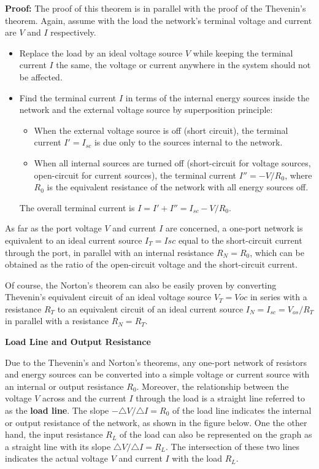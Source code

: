 \begin{itemize}
{\bf Proof:} The proof of this theorem is in parallel with the proof of the 
Thevenin's theorem. Again, assume with the load the network's terminal voltage 
and current are $V$ and $I$ respectively. 


\begin{itemize}
\item Replace the load by an ideal voltage source $V$ while keeping
  the terminal current $I$ the same, the voltage or current anywhere
  in the system should not be affected. 
	
\item Find the terminal current $I$ in terms of the internal energy sources 
  inside the network and the external voltage source by superposition principle:
  \begin{itemize}
  \item When the external voltage source is off (short circuit), the 
    terminal current $I'=I_{sc}$ is due only to the sources internal 
    to the network.
  \item When all internal sources are turned off (short-circuit for
    voltage sources, open-circuit for current sources), the terminal 
    current $I''=-V/R_0$, where $R_0$ is the equivalent resistance of 
    the network with all energy sources off.
  \end{itemize}
  The overall terminal current is $I=I'+I''=I_{sc}-V/R_0$. 
\end{itemize}
As far as the port voltage $V$ and current $I$ are concerned, a one-port
network is equivalent to an ideal current source $I_T=I{sc}$ equal to the
short-circuit current through the port, in parallel with an internal resistance
$R_N=R_0$, which can be obtained as the ratio of the open-circuit voltage
and the short-circuit current.

Of course, the Norton's theorem can also be easily proven by converting 
Thevenin's equivalent circuit of an ideal voltage source $V_T=V{oc}$ in 
series with a resistance $R_T$ to an equivalent circuit of an ideal current 
source $I_N=I_{sc}=V_{os}/R_T$ in parallel with a resistance $R_N=R_T$.

{\bf Load Line and Output Resistance}

Due to the Thevenin's and Norton's theorems, any one-port network of 
resistors and energy sources can be converted into a simple voltage or 
current source with an internal or output resistance $R_0$. Moreover, 
the relationship between the voltage $V$ across and the current $I$ 
through the load is a straight line referred to as the {\bf load line}.
The slope $-\triangle V/\triangle I=R_0$ of the load line indicates 
the internal or output resistance of the network, as shown in the
figure below. One the other hand, the input resistance $R_L$ of the 
load can also be represented on the graph as a straight line with its
slope $\triangle V/\triangle I=R_L$. The intersection of these two
lines indicates the actual voltage $V$ and current $I$ with the load
$R_L$.


\end{itemize}
